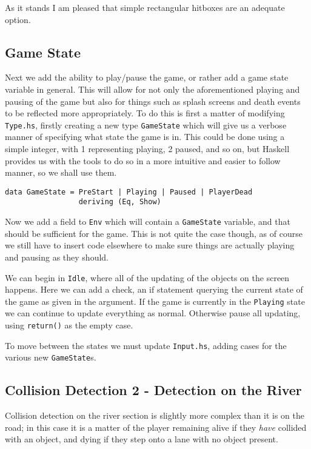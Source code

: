 \documentclass[12pt, a4paper]{report}
\begin{document}
As it stands I am pleased that simple rectangular hitboxes are an adequate option.

\subsection{Game State}

Next we add the ability to play/pause the game, or rather add a game state variable in general.
This will allow for not only the aforementioned playing and pausing of the game but also for things such as splash screens and death events to be reflected more appropriately.
To do this is first a matter of modifying \verb|Type.hs|, firstly creating a new type \verb|GameState| which will give us a verbose manner of specifying what state the game is in.
This could be done using a simple integer, with 1 representing playing, 2 paused, and so on, but Haskell provides us with the tools to do so in a more intuitive and easier to follow manner, so we shall use them.

\begin{lstlisting}
data GameState = PreStart | Playing | Paused | PlayerDead
                 deriving (Eq, Show)
\end{lstlisting}

Now we add a field to \verb|Env| which will contain a \verb|GameState| variable, and that should be sufficient for the game.
This is not quite the case though, as of course we still have to insert code elsewhere to make sure things are actually playing and pausing as they should.

\par

We can begin in \verb|Idle|, where all of the updating of the objects on the screen happens.
Here we can add a check, an if statement querying the current state of the game as given in the argument.
If the game is currently in the \verb|Playing| state we can continue to update everything as normal.
Otherwise pause all updating, using \verb|return()| as the empty case.

To move between the states we must update \verb|Input.hs|, adding cases for the various new \verb|GameState|s.

\subsection{Collision Detection 2 - Detection on the River}

Collision detection on the river section is slightly more complex than it is on the road; in this case it is a matter of the player remaining alive if they \textit{have} collided with an object, and dying if they step onto a lane with no object present.
\end{document}
